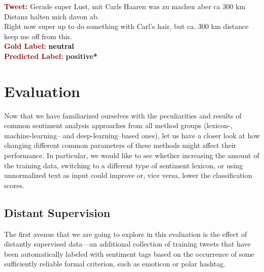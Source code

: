 \begin{example}\label{snt:cgsa:exmp:lba-error}
  \noindent\textup{\bfseries\textcolor{darkred}{Tweet:}} {\upshape
    \colorbox{green!0.5!blue!0.4}{Gerade} \colorbox{green!89}{super} \colorbox{blue!0.3}{Lust}, mit \colorbox{white!2}{Carls} Haaren \colorbox{white!0.6}{was} zu \colorbox{green!1}{machen} \colorbox{green!0.3}{aber} \colorbox{white!2}{ca} 300 \colorbox{white!1}{km}
    \colorbox{white!1}{Distanz} halten \colorbox{blue!0.3}{mich} davon \colorbox{white!1}{ab}.}\\
  \noindent \colorbox{green!0.5!blue!0.4}{Right now} \colorbox{green!89}{super} \colorbox{blue!0.3}{up to} \colorbox{green!1}{do} \colorbox{white!0.6}{something} with \colorbox{white!2}{Carl}'s hair, \colorbox{green!0.3}{but} \colorbox{white!2}{ca.} 300 \colorbox{white!1}{km}
  \colorbox{white!1}{distance} keep \colorbox{blue!0.3}{me} \colorbox{white!1}{off} from this.\\[\exampleSep]
  \noindent\textup{\bfseries\textcolor{darkred}{Gold Label:}}\hspace*{4.3em}\textbf{%
    \upshape\textcolor{black}{neutral}}\\
 \noindent\textup{\bfseries\textcolor{darkred}{Predicted Label:}}\hspace*{2em}\textbf{%
    \upshape\textcolor{green3}{positive*}}
\end{example}


\section{Evaluation}

Now that we have familiarized ourselves with the peculiarities and
results of common sentiment analysis approaches from all method groups
(lexicon-, machine-learning-- and deep-learning--based ones), let us
have a closer look at how changing different common parameters of
these methods might affect their performance.  In particular, we would
like to see whether increasing the amount of the training data,
switching to a different type of sentiment lexicon, or using
unnormalized text as input could improve or, vice versa, lower the
classification scores.

\subsection{Distant Supervision}

The first avenue that we are going to explore in this evaluation is
the effect of distantly supervised data---an additional collection of
training tweets that have been automatically labeled with sentiment
tags based on the occurrence of some sufficiently reliable formal
criterion, such as emoticon or polar hashtag.

